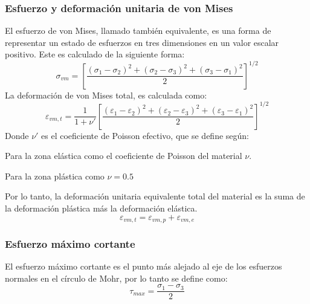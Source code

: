 \subsubsection{Esfuerzo y deformación unitaria de von Mises}
El esfuerzo de von Mises, llamado también equivalente, es una forma de representar un estado de esfuerzos en tres dimensiones en un valor escalar positivo. Este es calculado de la siguiente forma:
\begin{equation}
	\sigma_{vm} = \left[ \frac{(\sigma_1 - \sigma_2)^2 + (\sigma_2 - \sigma_3)^2 + (\sigma_3 - \sigma_1)^2}{2}\right]^{1/2}
\end{equation}
La deformación de von Mises total, es calculada como:
\begin{equation}
	\varepsilon_{vm,t} = \frac{1}{1+\nu'} \left[\frac{(\varepsilon_1 - \varepsilon_2)^2 + (\varepsilon_2 - \varepsilon_3)^2 + (\varepsilon_3 - \varepsilon_1)^2}{2}\right]^{1/2}
\end{equation}
Donde $\nu'$ es el coeficiente de Poisson efectivo, que se define según:
\begin{itemize*}
	\item Para la zona elástica como el coeficiente de Poisson del material $\nu$.
	\item Para la zona plástica como $\nu=0.5$
\end{itemize*}
Por lo tanto, la deformación unitaria equivalente total del material es la suma de la deformación plástica más la deformación elástica. 
\begin{equation}
	\varepsilon_{vm,t} = \varepsilon_{vm,p} + \varepsilon_{vm,e}
\end{equation}

\subsubsection{Esfuerzo máximo cortante}
El esfuerzo máximo cortante es el punto más alejado al eje de los esfuerzos normales en el círculo de Mohr, por lo tanto se define como:
\begin{equation}
	\tau_{max} = \frac{\sigma_1 - \sigma_3}{2}
\end{equation}

